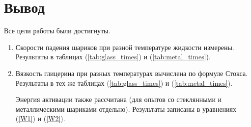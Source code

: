 \documentclass[a4paper,12pt]{article} %
\begin{document}
\section*{Вывод}

Все цели работы были достигнуты.

\begin{enumerate}
	\item Скорости падения шариков при разной температуре жидкости измерены. Результаты в таблицах (\ref{tab:glass_times}) и (\ref{tab:metal_times}).
	\item Вязкость глицерина при разных температурах вычислена по формуле Стокса. Результаты в тех же таблицах (\ref{tab:glass_times}) и (\ref{tab:metal_times}). 
	
	Энергия активации также рассчитана (для опытов со стеклянными и металлическими шариками отдельно). Результаты записаны в уравнениях (\ref{W1}) и (\ref{W2}).
\end{enumerate}
\end{document}
